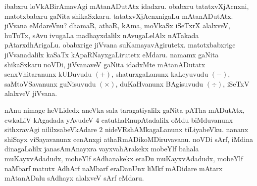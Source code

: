 \medskip

ibabxru loVkABirAmavAgi mAtanADutAtx idadxru. obabxru tatatxvXjAcnxni, matotxbabxru gaNita shikaSxkaru. tatatxvXjAcnxnigaLu mAtanADutAtx. jiVvana eMdareVnu? dhamaR, athaR, kAma, moVkaSx iSeTxrX alalxveV, huTuTx, sAvu ivugaLa madhayxdalilx nAvugaLelAlx nATakada pAtarxdhArigaLu. obabxrige jiVvana suKamayavAgirutetx. matotxbabxrige jiVvanadalilx kaSaTx kApaRNayxgaLirutetx eMdaru. namamx gaNita shikaSxkaru noVDi, jiVvanaveV gaNita idadxMte mAtanADutatx senxVhitaranunx kUDuvudu $(+)$, shaturxgaLanunx kaLeyuvudu $(-)$, saMtoVSavanunx guNisuvudu $(\times)$, duKaHvanunx BAgisuvudu $(\div)$, iSeTxV alalxveV jiVvana.

\medskip

nAnu nimage heVLidedx aneVka sala taragatiyalilx gaNita pATha mADutAtx, cwkaLiV kAgadada yAvudeV $4$ catuthaRnupAtadalilx oMdu biMduvanunx sithxravAgi nililxsabeVkAdare $2$ nideVRshAMkagaLanunx tiLiyabeVku. nananx shiSayx viSayavanunx cenAnxgi athaRmADikoMDiruvavanu. noVDi sArf, iMdina dinagaLalilx janasAmAnayxra vayxvahArakekx mobeYlf bahala muKayxvAdadudx, mobeYlf sAdhanakekx eraDu muKayxvAdadudx, mobeYlf naMbarf matutx AdhArf naMbarf eraDanUnx liMkf mADidare mAtarx mAtanADalu sAdhayx alalxveV sArf eMdaru.


